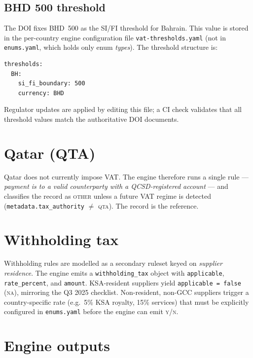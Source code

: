 \documentclass[11pt,a4paper,twoside]{report}
\newcommand{\corpus}{}
\begin{document}
\subsection{BHD 500 threshold}

The DOI fixes BHD~500 as the SI/FI threshold for Bahrain. This value is
stored in the per-country engine configuration file
\texttt{vat-thresholds.yaml} (not in \texttt{enums.yaml}, which holds
only enum \emph{types}). The threshold structure is:

\begin{lstlisting}[basicstyle=\ttfamily\small]
thresholds:
  BH:
    si_fi_boundary: 500
    currency: BHD
\end{lstlisting}

Regulator updates are applied by editing this file; a CI check validates
that all threshold values match the authoritative DOI documents.

\section{Qatar (QTA)}

Qatar does not currently impose VAT. The engine therefore runs a single
rule --- \emph{payment is to a valid counterparty with a QCSD-registered
account} --- and classifies the record as \textsc{other} unless a
future VAT regime is detected (\texttt{metadata.tax\_authority}
$\neq$ \textsc{qta}). The
\corpus{}
record is the reference.

\section{Withholding tax}

Withholding rules are modelled as a secondary ruleset keyed on
\emph{supplier residence}. The engine emits a
\texttt{withholding\_tax} object with \texttt{applicable}, \texttt{rate\_percent},
and \texttt{amount}. KSA-resident suppliers yield
\texttt{applicable~=~false} (\textsc{na}), mirroring the Q3 2025
checklist. Non-resident, non-GCC suppliers trigger a country-specific
rate (e.g.\ 5\% KSA royalty, 15\% services) that must be explicitly
configured in \texttt{enums.yaml} before the engine can emit
\textsc{y}/\textsc{n}.

\section{Engine outputs}
\end{document}
